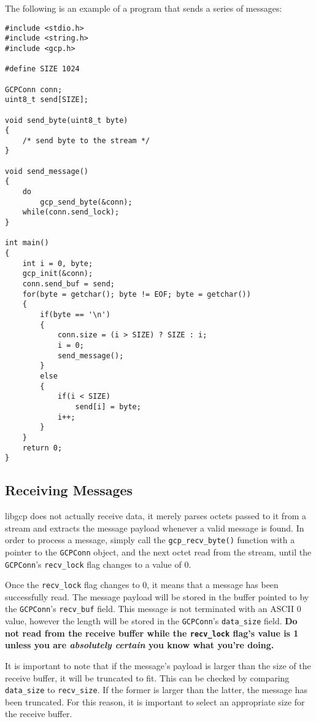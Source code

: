 \documentclass{article}
\begin{document}
The following is an example of a program that sends a series of
messages:
\begin{verbatim}
#include <stdio.h>
#include <string.h>
#include <gcp.h>

#define SIZE 1024

GCPConn conn;
uint8_t send[SIZE];

void send_byte(uint8_t byte)
{
    /* send byte to the stream */
}

void send_message()
{
    do
        gcp_send_byte(&conn);
    while(conn.send_lock);
}

int main()
{
    int i = 0, byte;
    gcp_init(&conn);
    conn.send_buf = send;
    for(byte = getchar(); byte != EOF; byte = getchar())
    {
        if(byte == '\n')
        {
            conn.size = (i > SIZE) ? SIZE : i;
            i = 0;
            send_message();
        }
        else
        {
            if(i < SIZE)
                send[i] = byte;
            i++;
        }
    }
    return 0;
}
\end{verbatim}

\subsection{Receiving Messages}
libgcp does not actually receive data, it merely parses octets passed
to it from a stream and extracts the message payload whenever a valid
message is found.  In order to process a message, simply call the
\texttt{gcp\_recv\_byte()} function with a pointer to the
\texttt{GCPConn} object, and the next octet read from the stream,
until the \texttt{GCPConn}'s \texttt{recv\_lock} flag changes to a
value of 0.

Once the \texttt{recv\_lock} flag changes to 0, it means that a
message has been successfully read.  The message payload will be
stored in the buffer pointed to by the \texttt{GCPConn}'s
\texttt{recv\_buf} field.  This message is not terminated with an
ASCII 0 value, however the length will be stored in the
\texttt{GCPConn}'s \texttt{data\_size} field.  \textbf{Do not read
  from the receive buffer while the \texttt{recv\_lock} flag's value
  is 1 unless you are \emph{absolutely certain} you know what you're
  doing.}

It is important to note that if the message's payload is larger than
the size of the receive buffer, it will be truncated to fit.  This can
be checked by comparing \texttt{data\_size} to \texttt{recv\_size}.
If the former is larger than the latter, the message has been
truncated. For this reason, it is important to select an appropriate
size for the receive buffer.
\end{document}
